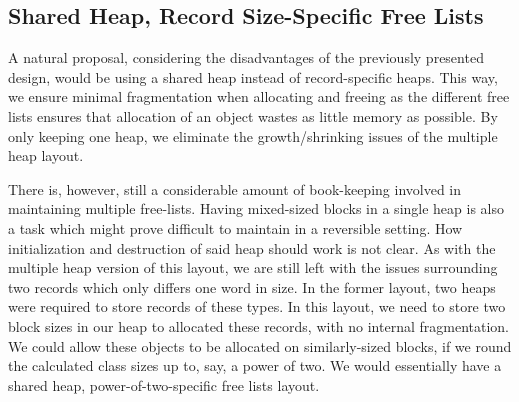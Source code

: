 \subsection{Shared Heap, Record Size-Specific Free Lists}
\label{subsec:shared-heap}
A natural proposal, considering the disadvantages of the previously presented design, would be using a shared heap instead of record-specific heaps. 
This way, we ensure minimal fragmentation when allocating and freeing as the different free lists ensures that allocation of an object wastes as little memory as possible. By only keeping one heap, we eliminate the growth/shrinking issues of the multiple heap layout. 

There is, however, still a considerable amount of book-keeping involved in maintaining multiple free-lists. Having mixed-sized blocks in a single heap is also a task which might prove difficult to maintain in a reversible setting. How initialization and destruction of said heap should work is not clear. As with the multiple heap version of this layout, we are still left with the issues surrounding two records which only differs one word in size. In the former layout, two heaps were required to store records of these types. In this layout, we need to store two block sizes in our heap to allocated these records, with no internal fragmentation. We could allow these objects to be allocated on similarly-sized blocks, if we round the calculated class sizes up to, say, a power of two. We would essentially have a shared heap, power-of-two-specific free lists layout.

